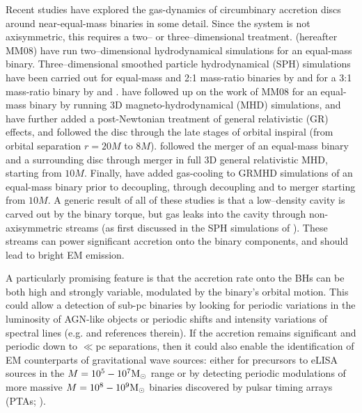 Recent studies have explored the gas-dynamics of circumbinary accretion
discs around near-equal-mass binaries in some detail.  Since the
system is not axisymmetric, this requires a two-- or
three--dimensional treatment.  \cite{MacFadyen:2008} (hereafter MM08)
have run two--dimensional hydrodynamical simulations for an equal-mass
binary. Three--dimensional smoothed particle hydrodynamical (SPH)
simulations have been carried out for equal-mass and 2:1 mass-ratio
binaries by \cite{Hayasaki:2007} and for a 3:1 mass-ratio binary by
\cite{Cuadra:2009} and \cite{Roedig:2012:Trqs}.
\cite{ShiKrolik:2012} have followed up on the work of MM08 for an
equal-mass binary by running 3D magneto-hydrodynamical (MHD)
simulations, and \cite{Noble+2012} have further added a post-Newtonian
treatment of general relativistic (GR) effects, and followed the disc
through the late stages of orbital inspiral (from orbital separation
$r=20M$ to $8M$).  \cite{FarrisShap:2011} followed the merger of an
equal-mass binary and a surrounding disc through merger in full 3D
general relativistic MHD, starting from $10M$. Finally,
\cite{FarrisGold:2012} have added gas-cooling to GRMHD simulations of an
equal-mass binary prior to decoupling, through decoupling and to
merger starting from $10M$.  A generic result of all of these studies
is that a low--density cavity is carved out by the binary torque, but
gas leaks into the cavity through non-axisymmetric streams 
(as first discussed in the SPH simulations of \citealt{ArtyLubow:1996}).  These
streams can power significant accretion onto the binary components,
and should lead to bright EM emission.

A particularly promising feature is that the accretion rate onto the
BHs can be both high and strongly variable, modulated by the binary's
orbital motion. This could allow a detection of sub-pc binaries by
looking for periodic variations in the luminosity of AGN-like objects
\citep{HKM09} or periodic shifts and intensity variations of spectral
lines (e.g. \citealt{HKM09,SL2010,Eracleous:2011} and references
therein). If the accretion remains significant and periodic down to
$\ll$pc separations, then it could also enable the identification of
EM counterparts of gravitational wave sources: either for precursors
to eLISA sources in the $M=10^5-10^7{\rm M_\odot}$ range
\citep{Kocsis+2006,Kocsis+2008} or by detecting periodic modulations
of more massive $M=10^8-10^9{\rm M_\odot}$ binaries discovered by
pulsar timing arrays (PTAs; \citealt{TMH:2012,Sesana+2012}).

